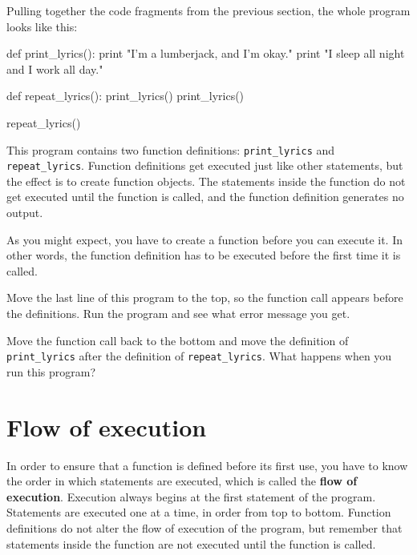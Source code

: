 Pulling together the code fragments from the previous section, the
whole program looks like this:

\beforeverb
\begin{pycode}
def print_lyrics():
    print "I'm a lumberjack, and I'm okay."
    print "I sleep all night and I work all day."

def repeat_lyrics():
    print_lyrics()
    print_lyrics()

repeat_lyrics()
\end{pycode}
\afterverb
%
This program contains two function definitions: \verb"print_lyrics" and
\verb"repeat_lyrics".  Function definitions get executed just like other
statements, but the effect is to create function objects.  The statements
inside the function do not get executed until the function is called, and
the function definition generates no output.


As you might expect, you have to create a function before you can
execute it.  In other words, the function definition has to be
executed before the first time it is called.

\begin{exercise}
Move the last line of this program
to the top, so the function call appears before the definitions. Run 
the program and see what error
message you get.
\end{exercise}

\begin{exercise}
Move the function call back to the bottom
and move the definition of \verb"print_lyrics" after the definition of
\verb"repeat_lyrics".  What happens when you run this program?
\end{exercise}


\section{Flow of execution}

In order to ensure that a function is defined before its first use,
you have to know the order in which statements are executed, which is
called the {\bf flow of execution}.
Execution always begins at the first statement of the program.
Statements are executed one at a time, in order from top to bottom.
Function definitions do not alter the flow of execution of the
program, but remember that statements inside the function are not
executed until the function is called.


